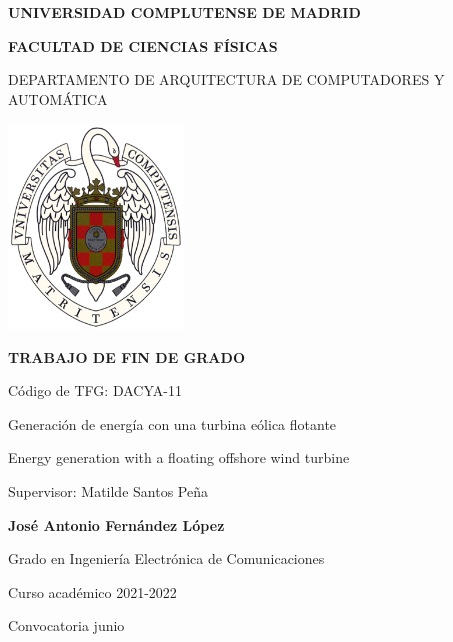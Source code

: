 
\begin{titlepage}
\centering
{ \bfseries \Large UNIVERSIDAD COMPLUTENSE DE MADRID}
\vspace{0.5cm}

{\bfseries  \Large FACULTAD DE CIENCIAS FÍSICAS} 
\vspace{1cm}

{\large DEPARTAMENTO DE ARQUITECTURA DE COMPUTADORES Y AUTOMÁTICA}
\vspace{0.8cm}

{\includegraphics[width=0.35\textwidth]{images/logo_UCM}} %
\vspace{0.8cm}

{\bfseries \Large TRABAJO DE FIN DE GRADO}
\vspace{2cm}

{\Large Código de TFG:  DACYA-11 } \vspace{5mm}

{\Large Generación de energía con una turbina eólica flotante}\vspace{5mm}

{\Large Energy generation with a floating offshore wind turbine}\vspace{5mm}

{\Large Supervisor: Matilde Santos Peña}\vspace{20mm} 

{\bfseries \LARGE José Antonio Fernández López}\vspace{5mm} 

{\large Grado en Ingeniería Electrónica de Comunicaciones}\vspace{5mm} 

{\large Curso académico 2021-2022}\vspace{5mm} 

{\large Convocatoria junio}\vspace{5mm} 

\end{titlepage}

